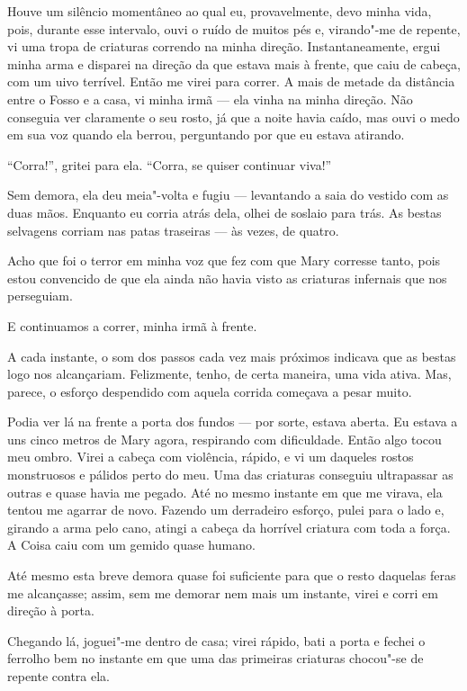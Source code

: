 Houve um silêncio momentâneo ao qual eu, provavelmente, devo minha vida, pois, durante esse intervalo, ouvi o ruído de
muitos pés e, virando"-me de repente, vi uma tropa de criaturas correndo na minha direção. Instantaneamente, ergui minha
arma e disparei na direção da que estava mais à frente, que caiu de cabeça, com um uivo terrível. Então me virei para
correr. A mais de metade da distância entre o Fosso e a casa, vi minha irmã --- ela vinha na minha direção. Não conseguia
ver claramente o seu rosto, já que a noite havia caído, mas ouvi o medo em sua voz quando ela berrou, perguntando por
que eu estava atirando.

``Corra!'', gritei para ela. ``Corra, se quiser continuar viva!''

Sem demora, ela deu meia"-volta e fugiu --- levantando a saia do vestido com as duas mãos. Enquanto eu corria atrás dela,
olhei de soslaio para trás. As bestas selvagens corriam nas patas traseiras --- às vezes, de quatro.

Acho que foi o terror em minha voz que fez com que Mary corresse tanto, pois estou convencido de que ela ainda não
havia visto as criaturas infernais que nos perseguiam.

E continuamos a correr, minha irmã à frente.

A cada instante, o som dos passos cada vez mais próximos indicava que as bestas logo nos alcançariam. Felizmente,
tenho, de certa maneira, uma vida ativa. Mas, parece, o esforço despendido com aquela corrida começava a pesar
muito.

Podia ver lá na frente a porta dos fundos --- por sorte, estava aberta. Eu estava a uns cinco metros de Mary agora,
respirando com dificuldade. Então algo tocou meu ombro. Virei a cabeça com violência, rápido, e vi um daqueles rostos
monstruosos e pálidos perto do meu. Uma das criaturas conseguiu ultrapassar as outras e quase havia me pegado. Até no
mesmo instante em que me virava, ela tentou me agarrar de novo. Fazendo um derradeiro esforço, pulei para o lado e,
girando a arma pelo cano, atingi a cabeça da horrível criatura com toda a força. A Coisa caiu com um gemido quase
humano.

Até mesmo esta breve demora quase foi suficiente para que o resto daquelas feras me alcançasse; assim, sem me demorar
nem mais um instante, virei e corri em direção à porta.

Chegando lá, joguei"-me dentro de casa; virei rápido, bati a porta e fechei o ferrolho bem no instante em que uma das
primeiras criaturas chocou"-se de repente contra ela.

